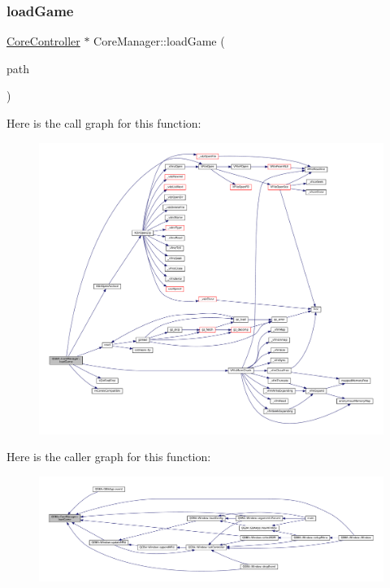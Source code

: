 \subsubsection{\texorpdfstring{load\+Game}{loadGame}\hspace{0.1cm}{\footnotesize\ttfamily [1/2]}}
{\footnotesize\ttfamily \mbox{\hyperlink{class_q_g_b_a_1_1_core_controller}{Core\+Controller}} $\ast$ Core\+Manager\+::load\+Game (\begin{DoxyParamCaption}\item[{const Q\+String \&}]{path }\end{DoxyParamCaption})\hspace{0.3cm}{\ttfamily [slot]}}

Here is the call graph for this function\+:
\nopagebreak
\begin{figure}[H]
\begin{center}
\leavevmode
\includegraphics[width=350pt]{class_q_g_b_a_1_1_core_manager_af12570d46c37a8f68d574767a7e80350_cgraph}
\end{center}
\end{figure}
Here is the caller graph for this function\+:
\nopagebreak
\begin{figure}[H]
\begin{center}
\leavevmode
\includegraphics[width=350pt]{class_q_g_b_a_1_1_core_manager_af12570d46c37a8f68d574767a7e80350_icgraph}
\end{center}
\end{figure}
\mbox{\label{class_q_g_b_a_1_1_core_manager_a1a53511511df13d821ffb60796213865}} 
